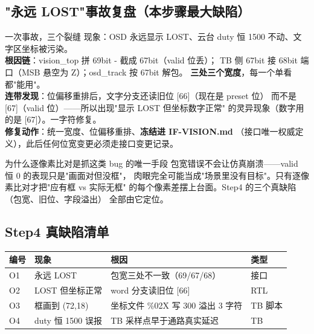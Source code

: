\subsection{"永远 LOST"事故复盘（本步骤最大缺陷）}

\begin{warnbox}{一次事故，三个裂缝}
现象：OSD 永远显示 LOST、云台 duty 恒 1500 不动、文字区坐标被污染。\\[3pt]
\textbf{根因链}：vision\_top 拼 69bit - 截成 67bit（valid 位丢）；
TB 侧 67bit 接 68bit 端口（MSB 悬空为 Z）；osd\_track 按 67bit 解包。
\textbf{三处三个宽度}，每一个单看都"能用"。\\[3pt]
\textbf{连带发现}：位偏移重排后，文字分支还读旧位 [66]（现在是 preset 位）
而不是 [67]（valid 位）——所以出现"显示 LOST 但坐标数字正常"
的灵异现象（数字用的是 [67]）。一字符修复。\\[3pt]
\textbf{修复动作}：统一宽度、位偏移重排、\textbf{冻结进 IF-VISION.md}
（接口唯一权威定义），此后任何位宽变更必须走接口变更记录。
\end{warnbox}

\begin{keybox}{为什么逐像素比对是抓这类 bug 的唯一手段}
包宽错误不会让仿真崩溃——valid 恒 0 的表现只是"画面对但没框"，
肉眼完全可能当成"场景里没有目标"。只有逐像素比对才把"应有框 vs 实际无框"
的每个像素差摆上台面。Step4 的三个真缺陷（包宽、旧位、字段溢出）
全部由它定位。
\end{keybox}

\subsection{Step4 真缺陷清单}

\begin{center}
\begin{tabular}{llp{5.6cm}l}
\toprule
\rowcolor{rowtint}\textbf{编号} & \textbf{现象} & \textbf{根因} & \textbf{类型} \\
\midrule
O1 & 永远 LOST & 包宽三处不一致（69/67/68） & 接口 \\
O2 & LOST 但坐标正常 & word 分支读旧位 [66] & RTL \\
O3 & 框画到 (72,18) & 坐标文件 \%02X 写 300 溢出 3 字符 & TB 脚本 \\
O4 & duty 恒 1500 误报 & TB 采样点早于通路真实延迟 & TB \\
\bottomrule
\end{tabular}
\end{center}

